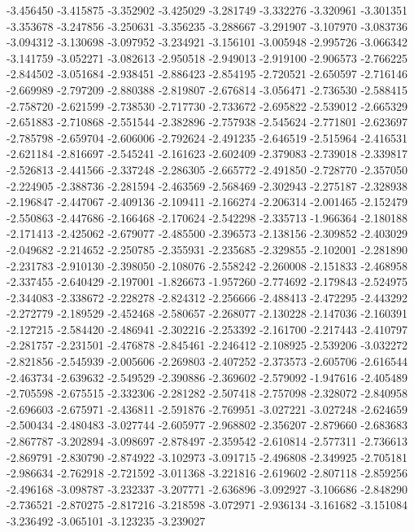 -3.456450
-3.415875
-3.352902
-3.425029
-3.281749
-3.332276
-3.320961
-3.301351
-3.353678
-3.247856
-3.250631
-3.356235
-3.288667
-3.291907
-3.107970
-3.083736
-3.094312
-3.130698
-3.097952
-3.234921
-3.156101
-3.005948
-2.995726
-3.066342
-3.141759
-3.052271
-3.082613
-2.950518
-2.949013
-2.919100
-2.906573
-2.766225
-2.844502
-3.051684
-2.938451
-2.886423
-2.854195
-2.720521
-2.650597
-2.716146
-2.669989
-2.797209
-2.880388
-2.819807
-2.676814
-3.056471
-2.736530
-2.588415
-2.758720
-2.621599
-2.738530
-2.717730
-2.733672
-2.695822
-2.539012
-2.665329
-2.651883
-2.710868
-2.551544
-2.382896
-2.757938
-2.545624
-2.771801
-2.623697
-2.785798
-2.659704
-2.606006
-2.792624
-2.491235
-2.646519
-2.515964
-2.416531
-2.621184
-2.816697
-2.545241
-2.161623
-2.602409
-2.379083
-2.739018
-2.339817
-2.526813
-2.441566
-2.337248
-2.286305
-2.665772
-2.491850
-2.728770
-2.357050
-2.224905
-2.388736
-2.281594
-2.463569
-2.568469
-2.302943
-2.275187
-2.328938
-2.196847
-2.447067
-2.409136
-2.109411
-2.166274
-2.206314
-2.001465
-2.152479
-2.550863
-2.447686
-2.166468
-2.170624
-2.542298
-2.335713
-1.966364
-2.180188
-2.171413
-2.425062
-2.679077
-2.485500
-2.396573
-2.138156
-2.309852
-2.403029
-2.049682
-2.214652
-2.250785
-2.355931
-2.235685
-2.329855
-2.102001
-2.281890
-2.231783
-2.910130
-2.398050
-2.108076
-2.558242
-2.260008
-2.151833
-2.468958
-2.337455
-2.640429
-2.197001
-1.826673
-1.957260
-2.774692
-2.179843
-2.524975
-2.344083
-2.338672
-2.228278
-2.824312
-2.256666
-2.488413
-2.472295
-2.443292
-2.272779
-2.189529
-2.452468
-2.580657
-2.268077
-2.130228
-2.147036
-2.160391
-2.127215
-2.584420
-2.486941
-2.302216
-2.253392
-2.161700
-2.217443
-2.410797
-2.281757
-2.231501
-2.476878
-2.845461
-2.246412
-2.108925
-2.539206
-3.032272
-2.821856
-2.545939
-2.005606
-2.269803
-2.407252
-2.373573
-2.605706
-2.616544
-2.463734
-2.639632
-2.549529
-2.390886
-2.369602
-2.579092
-1.947616
-2.405489
-2.705598
-2.675515
-2.332306
-2.281282
-2.507418
-2.757098
-2.328072
-2.840958
-2.696603
-2.675971
-2.436811
-2.591876
-2.769951
-3.027221
-3.027248
-2.624659
-2.500434
-2.480483
-3.027744
-2.605977
-2.968802
-2.356207
-2.879660
-2.683683
-2.867787
-3.202894
-3.098697
-2.878497
-2.359542
-2.610814
-2.577311
-2.736613
-2.869791
-2.830790
-2.874922
-3.102973
-3.091715
-2.496808
-2.349925
-2.705181
-2.986634
-2.762918
-2.721592
-3.011368
-3.221816
-2.619602
-2.807118
-2.859256
-2.496168
-3.098787
-3.232337
-3.207771
-2.636896
-3.092927
-3.106686
-2.848290
-2.736521
-2.870275
-2.817216
-3.218598
-3.072971
-2.936134
-3.161682
-3.151084
-3.236492
-3.065101
-3.123235
-3.239027
